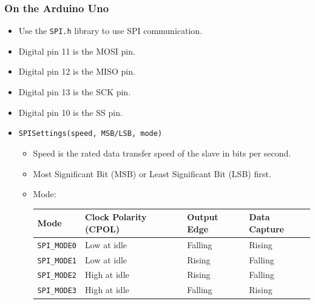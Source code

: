 \documentclass[11pt]{article}
\begin{document}
\subsubsection{On the Arduino Uno}
\label{sec:org349926e}
\begin{itemize}
\item Use the \texttt{SPI.h} library to use SPI communication.
\item Digital pin 11 is the MOSI pin.
\item Digital pin 12 is the MISO pin.
\item Digital pin 13 is the SCK pin.
\item Digital pin 10 is the SS pin.
\item \texttt{SPISettings(speed, MSB/LSB, mode)}
\begin{itemize}
\item Speed is the rated data transfer speed of the slave in bits per second.
\item Most Significant Bit (MSB) or Least Significant Bit (LSB) first.
\item Mode:
\begin{center}
\begin{tabular}{llll}
Mode & Clock Polarity (CPOL) & Output Edge & Data Capture\\[0pt]
\hline
\texttt{SPI\_MODE0} & Low at idle & Falling & Rising\\[0pt]
\texttt{SPI\_MODE1} & Low at idle & Rising & Falling\\[0pt]
\texttt{SPI\_MODE2} & High at idle & Rising & Falling\\[0pt]
\texttt{SPI\_MODE3} & High at idle & Falling & Rising\\[0pt]
\end{tabular}
\end{center}
\end{itemize}
\end{itemize}
\end{document}
